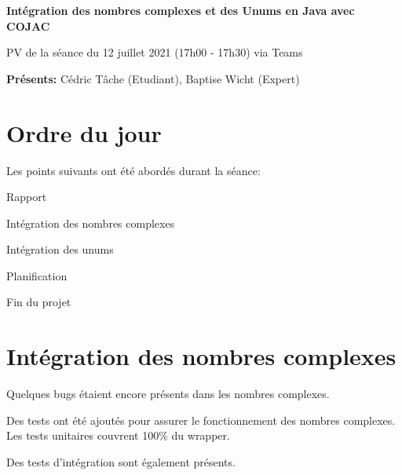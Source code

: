 \documentclass[11pt]{meetingmins}
\date{12 juillet 2021}
\begin{document}
\begin {center} {
    \large \textbf {Intégration des nombres complexes et des Unums en Java avec COJAC}
}
\vspace {0.5ex}

PV de la séance du 12 juillet 2021 (17h00 - 17h30) via Teams
\end {center} \vspace {1.5em}

\noindent
\textbf{Présents:} Cédric Tâche (Etudiant), Baptise Wicht (Expert)

\section{Ordre du jour}
Les points suivants ont été abordés durant la séance:
\begin{hiddenitems}
    \item Rapport
    \item Intégration des nombres complexes
    \item Intégration des unums
    \item Planification
    \item Fin du projet
\end{hiddenitems}

\section{Intégration des nombres complexes}
\begin{hiddenitems}
    \item Quelques bugs étaient encore présents dans les nombres complexes.
    \item Des tests ont été ajoutés pour assurer le fonctionnement des nombres complexes. Les tests unitaires couvrent 100\% du wrapper.
    \item Des tests d'intégration sont également présents.
\end{hiddenitems}
\end{document}
